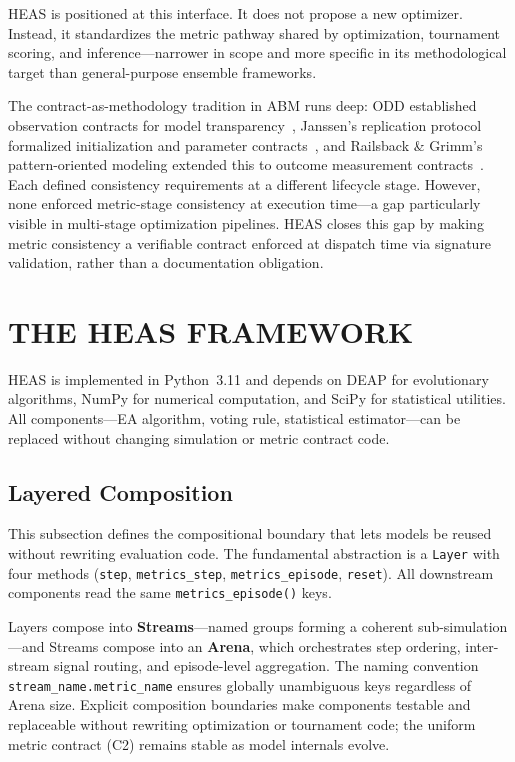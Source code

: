 \documentclass{wscpaperproc}
\begin{document}
HEAS is positioned at this interface. It does not propose a new optimizer.
Instead, it standardizes the metric pathway shared by optimization, tournament
scoring, and inference---narrower in scope and more specific in its methodological target
than general-purpose ensemble frameworks.

The contract-as-methodology tradition in ABM runs deep: ODD established observation
contracts for model transparency~\cite{grimm2006odd}, Janssen's replication protocol
formalized initialization and parameter contracts~\cite{janssen2008towards}, and
Railsback \& Grimm's pattern-oriented modeling extended this to outcome measurement
contracts~\cite{railsback2006agent}. Each defined consistency requirements at a
different lifecycle stage. However, none enforced metric-stage consistency at execution
time---a gap particularly visible in multi-stage optimization pipelines. HEAS closes this
gap by making metric consistency a verifiable contract enforced at dispatch time via
signature validation, rather than a documentation obligation.

\section{THE HEAS FRAMEWORK}

HEAS is implemented in Python~3.11 and depends on DEAP for evolutionary
algorithms, NumPy for numerical computation, and SciPy for statistical
utilities. All components---EA algorithm, voting rule, statistical
estimator---can be replaced without changing simulation or metric contract code.

\subsection{Layered Composition}

This subsection defines the compositional boundary that lets models be reused
without rewriting evaluation code. The fundamental abstraction is a
\texttt{Layer} with four methods
(\texttt{step}, \texttt{metrics\_step}, \texttt{metrics\_episode},
\texttt{reset}). All downstream components read the same
\texttt{metrics\_episode()} keys.

Layers compose into \textbf{Streams}---named groups forming a coherent
sub-simulation---and Streams compose into an \textbf{Arena}, which orchestrates
step ordering, inter-stream signal routing, and episode-level aggregation. The
naming convention \texttt{stream\_name.metric\_name} ensures globally unambiguous
keys regardless of Arena size. Explicit composition boundaries make components
testable and replaceable without rewriting optimization or tournament code;
the uniform metric contract (C2) remains stable as model internals evolve.
\end{document}
